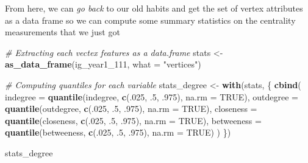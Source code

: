 \documentclass[
]{book}
\newenvironment{Shaded}{\begin{snugshade}}{\end{snugshade}}
\newcommand{\AttributeTok}[1]{\textcolor[rgb]{0.13,0.29,0.53}{#1}}
\newcommand{\CommentTok}[1]{\textcolor[rgb]{0.56,0.35,0.01}{\textit{#1}}}
\newcommand{\ConstantTok}[1]{\textcolor[rgb]{0.56,0.35,0.01}{#1}}
\newcommand{\DecValTok}[1]{\textcolor[rgb]{0.00,0.00,0.81}{#1}}
\newcommand{\FunctionTok}[1]{\textcolor[rgb]{0.13,0.29,0.53}{\textbf{#1}}}
\newcommand{\NormalTok}[1]{#1}
\newcommand{\OtherTok}[1]{\textcolor[rgb]{0.56,0.35,0.01}{#1}}
\newcommand{\SpecialCharTok}[1]{\textcolor[rgb]{0.81,0.36,0.00}{\textbf{#1}}}
\newcommand{\StringTok}[1]{\textcolor[rgb]{0.31,0.60,0.02}{#1}}
\begin{document}
\begin{Shaded}
\end{Shaded}

From here, we can \emph{go back} to our old habits and get the set of vertex attributes as a data frame so we can compute some summary statistics on the centrality measurements that we just got

\begin{Shaded}
\begin{Highlighting}[]
\CommentTok{\# Extracting each vectex features as a data.frame}
\NormalTok{stats }\OtherTok{\textless{}{-}} \FunctionTok{as\_data\_frame}\NormalTok{(ig\_year1\_111, }\AttributeTok{what =} \StringTok{"vertices"}\NormalTok{)}

\CommentTok{\# Computing quantiles for each variable}
\NormalTok{stats\_degree }\OtherTok{\textless{}{-}} \FunctionTok{with}\NormalTok{(stats, \{}
 \FunctionTok{cbind}\NormalTok{(}
   \AttributeTok{indegree   =} \FunctionTok{quantile}\NormalTok{(indegree, }\FunctionTok{c}\NormalTok{(.}\DecValTok{025}\NormalTok{, .}\DecValTok{5}\NormalTok{, .}\DecValTok{975}\NormalTok{), }\AttributeTok{na.rm =} \ConstantTok{TRUE}\NormalTok{),}
   \AttributeTok{outdegree  =} \FunctionTok{quantile}\NormalTok{(outdegree, }\FunctionTok{c}\NormalTok{(.}\DecValTok{025}\NormalTok{, .}\DecValTok{5}\NormalTok{, .}\DecValTok{975}\NormalTok{), }\AttributeTok{na.rm =} \ConstantTok{TRUE}\NormalTok{),}
   \AttributeTok{closeness  =} \FunctionTok{quantile}\NormalTok{(closeness, }\FunctionTok{c}\NormalTok{(.}\DecValTok{025}\NormalTok{, .}\DecValTok{5}\NormalTok{, .}\DecValTok{975}\NormalTok{), }\AttributeTok{na.rm =} \ConstantTok{TRUE}\NormalTok{),}
   \AttributeTok{betweeness =} \FunctionTok{quantile}\NormalTok{(betweeness, }\FunctionTok{c}\NormalTok{(.}\DecValTok{025}\NormalTok{, .}\DecValTok{5}\NormalTok{, .}\DecValTok{975}\NormalTok{), }\AttributeTok{na.rm =} \ConstantTok{TRUE}\NormalTok{)}
\NormalTok{ )}
\NormalTok{\})}

\NormalTok{stats\_degree}
\end{Highlighting}
\end{Shaded}
\end{document}
